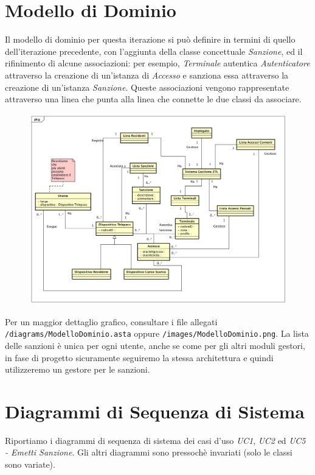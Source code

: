 \documentclass[12pt, letterpaper]{article}
\begin{document}
\section{Modello di Dominio}
Il modello di dominio per questa iterazione si può definire 
in termini di quello dell'iterazione precedente, con l'aggiunta 
della classe concettuale \emph{Sanzione}, ed il rifinimento 
di alcune associazioni: per esempio, \emph{Terminale} autentica 
\emph{Autenticatore} attraverso la creazione di un'istanza di 
\emph{Accesso} e sanziona essa attraverso la creazione di un'istanza
\emph{Sanzione}. Queste associazioni vengono rappresentate 
attraverso una linea che punta alla linea che connette le due 
classi da associare.
\begin{figure}[H]
    \centering
    \includegraphics[scale=0.35]{ModelloDominio}
\end{figure}

\noindent
Per un maggior dettaglio grafico, consultare i file allegati
\texttt{/diagrams/ModelloDominio.asta} oppure
\texttt{/images/ModelloDominio.png}.
La lista delle sanzioni è unica per ogni utente, anche se 
come per gli altri moduli gestori, in fase di progetto 
sicuramente seguiremo la stessa architettura e quindi 
utilizzeremo un gestore per le sanzioni.

\section{Diagrammi di Sequenza di Sistema}
Riportiamo i diagrammi di sequenza di sistema 
dei casi d'uso \emph{UC1},
\emph{UC2} ed \emph{UC5 
- Emetti Sanzione}. Gli altri diagrammi 
sono pressochè invariati (solo le classi sono 
variate).
\end{document}
